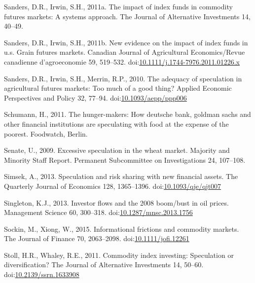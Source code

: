 \documentclass[]{elsarticle} %
\begin{document}
\leavevmode\hypertarget{ref-sanders_impact_2011}{}%
Sanders, D.R., Irwin, S.H., 2011a. The impact of index funds in
commodity futures markets: A systems approach. The Journal of
Alternative Investments 14, 40--49.

\leavevmode\hypertarget{ref-sanders_new_2011}{}%
Sanders, D.R., Irwin, S.H., 2011b. New evidence on the impact of index
funds in u.s. Grain futures markets. Canadian Journal of Agricultural
Economics/Revue canadienne d'agroeconomie 59, 519--532.
doi:\href{https://doi.org/10.1111/j.1744-7976.2011.01226.x}{10.1111/j.1744-7976.2011.01226.x}

\leavevmode\hypertarget{ref-sanders_adequacy_2010}{}%
Sanders, D.R., Irwin, S.H., Merrin, R.P., 2010. The adequacy of
speculation in agricultural futures markets: Too much of a good thing?
Applied Economic Perspectives and Policy 32, 77--94.
doi:\href{https://doi.org/10.1093/aepp/ppp006}{10.1093/aepp/ppp006}

\leavevmode\hypertarget{ref-schumann_hunger_2011}{}%
Schumann, H., 2011. The hunger-makers: How deutsche bank, goldman sachs
and other financial institutions are speculating with food at the
expense of the poorest. Foodwatch, Berlin.

\leavevmode\hypertarget{ref-senate_excessive_2009}{}%
Senate, U., 2009. Excessive speculation in the wheat market. Majority
and Minority Staff Report. Permanent Subcommittee on Investigations 24,
107--108.

\leavevmode\hypertarget{ref-simsek_speculation_2013}{}%
Simsek, A., 2013. Speculation and risk sharing with new financial
assets. The Quarterly Journal of Economics 128, 1365--1396.
doi:\href{https://doi.org/10.1093/qje/qjt007}{10.1093/qje/qjt007}

\leavevmode\hypertarget{ref-singleton_investor_2013}{}%
Singleton, K.J., 2013. Investor flows and the 2008 boom/bust in oil
prices. Management Science 60, 300--318.
doi:\href{https://doi.org/10.1287/mnsc.2013.1756}{10.1287/mnsc.2013.1756}

\leavevmode\hypertarget{ref-sockin_informational_2015}{}%
Sockin, M., Xiong, W., 2015. Informational frictions and commodity
markets. The Journal of Finance 70, 2063--2098.
doi:\href{https://doi.org/10.1111/jofi.12261}{10.1111/jofi.12261}

\leavevmode\hypertarget{ref-stoll_commodity_2011}{}%
Stoll, H.R., Whaley, R.E., 2011. Commodity index investing: Speculation
or diversification? The Journal of Alternative Investments 14, 50--60.
doi:\href{https://doi.org/10.2139/ssrn.1633908}{10.2139/ssrn.1633908}
\end{document}
